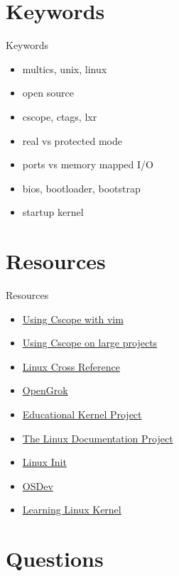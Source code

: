 \documentclass{workshop}
\begin{document}
\section{Keywords}

\begin{frame}{Keywords}
     \begin{itemize}
	\item multics, unix, linux
	\item open source
        \item cscope, ctags, lxr
        \item real vs protected mode
        \item ports vs memory mapped I/O
        \item bios, bootloader, bootstrap
        \item startup kernel
      \end{itemize}
\end{frame}

\section{Resources}
\begin{frame}{Resources}
  \begin{itemize}
  \item \href{http://cscope.sourceforge.net/cscope_vim_tutorial.html}{Using Cscope with vim}
  \item \href{http://cscope.sourceforge.net/large_projects.html}{Using Cscope on large projects}
  \item \href{http://lxr.free-electrons.com/}{Linux Cross Reference}
  \item \href{http://hub.opensolaris.org/bin/view/Project+opengrok/}{OpenGrok}
  \item \href{http://oszur11.git.sourceforge.net/git/gitweb.cgi?p=oszur11/oszur11;a=tree;hb=e2c6c782f3595dcb5293d790a28d67f47529cfaf}{Educational
  Kernel Project}
  \item \href{http://tldp.org/}{The Linux Documentation Project}
  \item \href{http://tldp.org/HOWTO/Linux-Init-HOWTO.html}{Linux Init}
  \item \href{http://wiki.osdev.org/Main_Page}{OSDev}
  \item \href{http://www.learninglinuxkernel.com/}{Learning Linux Kernel}
  \end{itemize}
\end{frame}

\section{Questions}
\end{document}
